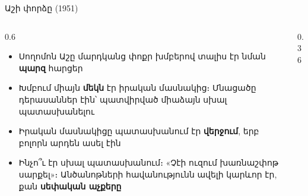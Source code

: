 \begin{frame}{Աշի փորձը (1951)}
  \begin{columns}[c]
    \begin{column}{0.6\textwidth}
      \begin{itemize}
        \item Սողոմոն Աշը մարդկանց փոքր խմբերով տալիս էր նման \textbf{պարզ} հարցեր
        \item Խմբում միայն \textbf{մեկն} էր իրական մասնակից։ Մնացածը դերասաններ էին՝ պատվիրված միաձայն սխալ պատասխանելու
        \item Իրական մասնակիցը պատասխանում էր \textbf{վերջում}, երբ բոլորն արդեն ասել էին
        \item<2-> Ինչո՞ւ էր սխալ պատասխանում։ «Չէի ուզում խառնաշփոթ սարքել»։ Անծանոթների հավանությունն ավելի կարևոր էր, քան \textbf{սեփական աչքերը}
      \end{itemize}
    \end{column}
    \begin{column}{0.36\textwidth}
      \centering
    \end{column}
  \end{columns}
\end{frame}

